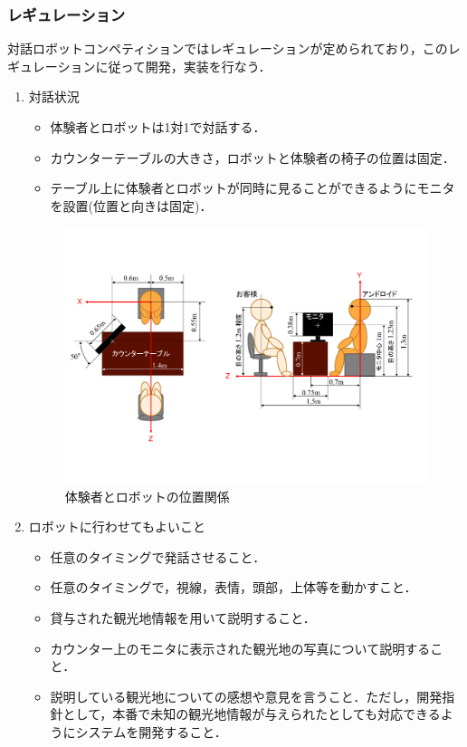 \subsubsection{レギュレーション}
対話ロボットコンペティションではレギュレーションが定められており，このレギュレーションに従って開発，実装を行なう．
\begin{enumerate}
    \item 対話状況
    \begin{itemize}
        \item 体験者とロボットは1対1で対話する．
        \item カウンターテーブルの大きさ，ロボットと体験者の椅子の位置は固定．
        \item テーブル上に体験者とロボットが同時に見ることができるようにモニタを設置(位置と向きは固定)．
    \end{itemize}
    \begin{figure}[th]
        \centering
        \includegraphics[scale=0.5,angle=270]{pic/robot_location.pdf}
        \caption{体験者とロボットの位置関係}
    \end{figure}
    \item ロボットに行わせてもよいこと
    \begin{itemize}
        \item 任意のタイミングで発話させること．
        \item 任意のタイミングで，視線，表情，頭部，上体等を動かすこと．
        \item 貸与された観光地情報を用いて説明すること．
        \item カウンター上のモニタに表示された観光地の写真について説明すること．
        \item 説明している観光地についての感想や意見を言うこと．ただし，開発指針として，本番で未知の観光地情報が与えられたとしても対応できるようにシステムを開発すること．

\end{itemize}
\end{enumerate}
